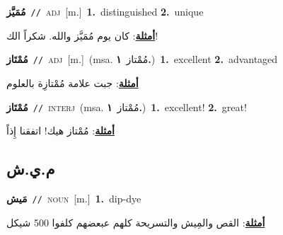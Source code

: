 \documentclass[10pt,a4paper,twoside]{article} %
\begin{document}
\begin{multicols}{2}
{\setlength\topsep{0pt}\textbf{\foreignlanguage{arabic}{مُمَيَّز}}\ {\color{gray}\texttt{//}\color{black}}\ \textsc{adj}\ [m.]\ \textbf{1.}~distinguished  \textbf{2.}~unique\  \begin{flushright}\color{gray}\foreignlanguage{arabic}{\textbf{\underline{\foreignlanguage{arabic}{أمثلة}}}: كان يوم مُمَيَّز والله. شكراً الك!}\end{flushright}\color{black}} \vspace{2mm}

{\setlength\topsep{0pt}\textbf{\foreignlanguage{arabic}{مُمْتَاز}}\ {\color{gray}\texttt{//}\color{black}}\ \textsc{adj}\ [m.]\ \color{gray}(msa. \foreignlanguage{arabic}{مُمْتاز}~\foreignlanguage{arabic}{\textbf{١.}})\color{black}\ \textbf{1.}~excellent  \textbf{2.}~advantaged\  \begin{flushright}\color{gray}\foreignlanguage{arabic}{\textbf{\underline{\foreignlanguage{arabic}{أمثلة}}}: جبت علامة مُمْتازِة بالعلوم}\end{flushright}\color{black}} \vspace{2mm}

{\setlength\topsep{0pt}\textbf{\foreignlanguage{arabic}{مُمْتَاز}}\ {\color{gray}\texttt{//}\color{black}}\ \textsc{interj}\ \color{gray}(msa. \foreignlanguage{arabic}{مُمْتاز}~\foreignlanguage{arabic}{\textbf{١.}})\color{black}\ \textbf{1.}~excellent!  \textbf{2.}~great!\  \begin{flushright}\color{gray}\foreignlanguage{arabic}{\textbf{\underline{\foreignlanguage{arabic}{أمثلة}}}: مُمْتاز هيك! اتفقنا إِذاً}\end{flushright}\color{black}} \vspace{2mm}

\vspace{-3mm}
\subsection*{\color{blue}\foreignlanguage{arabic}{م.ي.ش}\color{blue}{}} 

{\setlength\topsep{0pt}\textbf{\foreignlanguage{arabic}{مَيش}}\ {\color{gray}\texttt{//}\color{black}}\ \textsc{noun}\ [m.]\ \textbf{1.}~dip-dye\  \begin{flushright}\color{gray}\foreignlanguage{arabic}{\textbf{\underline{\foreignlanguage{arabic}{أمثلة}}}: القص والمِيش والتسريحة كلهم عبعضهم كلفوا 500 شيكل}\end{flushright}\color{black}} \vspace{2mm}


\end{multicols}
\end{document}
